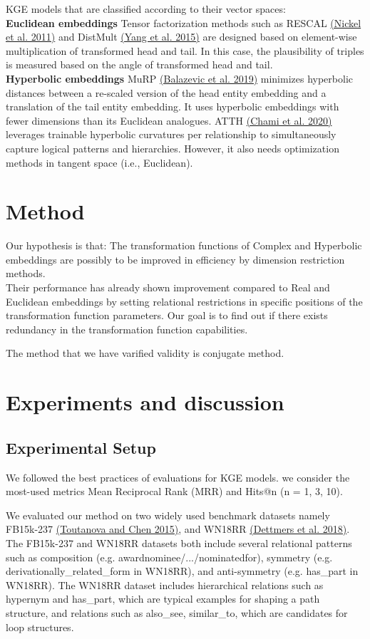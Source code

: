 \documentclass[9pt]{ctexart}
\theoremstyle{definition}
\begin{document}
KGE models that are classified according to their vector spaces:\\
\textbf{Euclidean embeddings} Tensor factorization methods such as RESCAL 
\hyperlink{Nic11}{(Nickel et al. 2011)} 
and DistMult 
\hyperlink{Yan15}{(Yang et al. 2015)}
are designed based on element-wise multiplication of transformed head and tail. 
In this case, the plausibility of triples is measured based on the angle of transformed head and tail.\\
\textbf{Hyperbolic embeddings} MuRP 
\hyperlink{Bal19}{(Balazevic et al. 2019)}
minimizes hyperbolic distances between a re-scaled version of the head entity embedding and a translation of the tail entity embedding. 
It uses hyperbolic embeddings with fewer dimensions than its Euclidean analogues.
ATTH 
\hyperlink{Cha20}{(Chami et al. 2020)}
leverages trainable hyperbolic curvatures per relationship to simultaneously capture logical patterns and hierarchies.
However, it also needs optimization methods in tangent space (i.e., Euclidean).

\section{Method}
Our hypothesis is that: The transformation functions of Complex and Hyperbolic embeddings are possibly to be improved in efficiency by dimension restriction methods.\\ 
Their performance has already shown improvement compared to Real and Euclidean embeddings by setting relational restrictions in specific positions of the transformation function parameters.
Our goal is to find out if there exists redundancy in the transformation function capabilities.

The method that we have varified validity is conjugate method.

\section{Experiments and discussion}
\subsection{Experimental Setup}
We followed the best practices of evaluations for KGE models. 
we consider the most-used metrics Mean Reciprocal Rank (MRR) and Hits@n (n = 1, 3, 10). 

We evaluated our method on two widely used benchmark datasets namely FB15k-237 
\hyperlink{Tou15}{(Toutanova and Chen 2015)}, 
and WN18RR 
\hyperlink{Det18}{(Dettmers et al. 2018)}. 
The FB15k-237 and WN18RR datasets both include several relational patterns such as composition (e.g. awardnominee/.../nominatedfor), 
symmetry (e.g. derivationally\_related\_form in WN18RR), and anti-symmetry (e.g. has\_part in WN18RR). 
The WN18RR dataset includes hierarchical relations such as hypernym and has\_part, which are typical examples for shaping a path structure, 
and relations such as also\_see, similar\_to, which are candidates for loop structures. 
\end{document}

